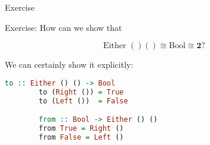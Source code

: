 \documentclass[tikz]{beamer}
\theoremstyle{definition}
\begin{document}
\begin{frame}{Exercise}

\begin{block}{}
Exercise: How can we show that
\begin{center}
	\begin{equation*}
		\text{Either $() ()$} \cong \text{Bool} \cong \mathbf{2}?
	\end{equation*}
\end{center}
\end{block}

\end{frame}

\begin{frame}[fragile]
We can certainly show it explicitly: 

\begin{block}{}

\begin{center}
	\begin{lstlisting}[language=Haskell]
		to :: Either () () -> Bool
		to (Right ()) = True
		to (Left ())  = False

		from :: Bool -> Either () ()
		from True = Right ()
		from False = Left ()
	\end{lstlisting}
\end{center}
\end{block}
\end{frame}
\end{document}
